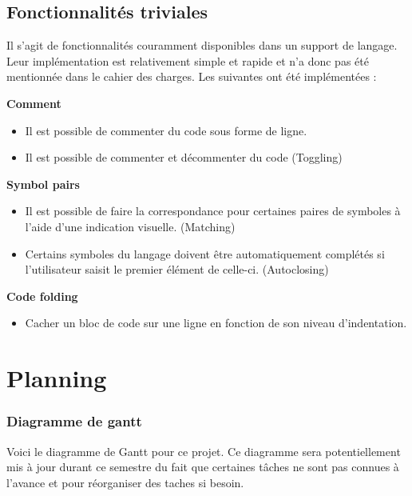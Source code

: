 \documentclass[
    iict, %
    il, %
]{heig-tb}
\begin{document}
\section{Fonctionnalités triviales}
Il s'agit de fonctionnalités couramment disponibles dans un support de langage. Leur implémentation est relativement simple et rapide et n'a donc pas été mentionnée dans le cahier des charges.
Les suivantes ont été implémentées :

\textbf{Comment}
\begin{itemize}
    \item Il est possible de commenter du code sous forme de ligne.
    \item Il est possible de commenter et décommenter du code (Toggling)
\end{itemize}

\textbf{Symbol pairs}
\begin{itemize}
    \item Il est possible de faire la correspondance pour certaines paires de symboles à l'aide d'une indication visuelle. (Matching)
    \item Certains symboles du langage doivent être automatiquement complétés si l'utilisateur saisit le premier élément de celle-ci. (Autoclosing)
\end{itemize}

\textbf{Code folding}
\begin{itemize}
    \item Cacher un bloc de code sur une ligne en fonction de son niveau d'indentation.
\end{itemize}


\chapter{Planning}


\subsection{Diagramme de gantt}
Voici le diagramme de Gantt pour ce projet.
Ce diagramme sera potentiellement mis à jour durant ce semestre du fait que certaines tâches ne sont pas connues à l'avance et pour réorganiser des taches si besoin.
\end{document}
